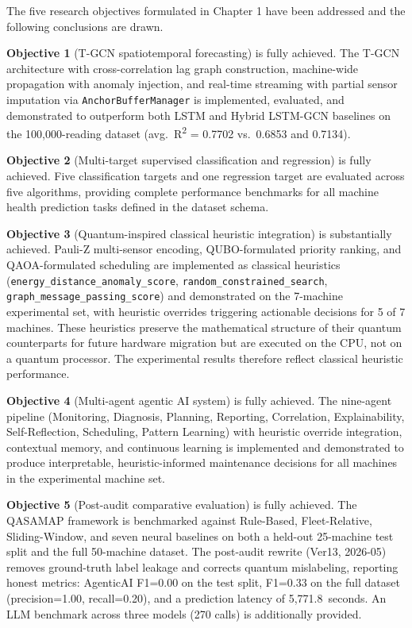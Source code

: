 The five research objectives formulated in Chapter 1 have been addressed and the following conclusions are drawn.

\textbf{Objective 1} (T-GCN spatiotemporal forecasting) is fully achieved. The T-GCN architecture with cross-correlation lag graph construction, machine-wide propagation with anomaly injection, and real-time streaming with partial sensor imputation via \texttt{AnchorBufferManager} is implemented, evaluated, and demonstrated to outperform both LSTM and Hybrid LSTM-GCN baselines on the 100,000-reading dataset (avg.\ R\textsuperscript{2} = 0.7702 vs.\ 0.6853 and 0.7134).

\textbf{Objective 2} (Multi-target supervised classification and regression) is fully achieved. Five classification targets and one regression target are evaluated across five algorithms, providing complete performance benchmarks for all machine health prediction tasks defined in the dataset schema.

\textbf{Objective 3} (Quantum-inspired classical heuristic integration) is substantially achieved. Pauli-Z multi-sensor encoding, QUBO-formulated priority ranking, and QAOA-formulated scheduling are implemented as classical heuristics (\texttt{energy\_distance\_anomaly\_score}, \texttt{random\_constrained\_search}, \texttt{graph\_message\_passing\_score}) and demonstrated on the 7-machine experimental set, with heuristic overrides triggering actionable decisions for 5 of 7 machines. These heuristics preserve the mathematical structure of their quantum counterparts for future hardware migration but are executed on the CPU, not on a quantum processor. The experimental results therefore reflect classical heuristic performance.

\textbf{Objective 4} (Multi-agent agentic AI system) is fully achieved. The nine-agent pipeline (Monitoring, Diagnosis, Planning, Reporting, Correlation, Explainability, Self-Reflection, Scheduling, Pattern Learning) with heuristic override integration, contextual memory, and continuous learning is implemented and demonstrated to produce interpretable, heuristic-informed maintenance decisions for all machines in the experimental machine set.

\textbf{Objective 5} (Post-audit comparative evaluation) is fully achieved. The QASAMAP framework is benchmarked against Rule-Based, Fleet-Relative, Sliding-Window, and seven neural baselines on both a held-out 25-machine test split and the full 50-machine dataset. The post-audit rewrite (Ver13, 2026-05) removes ground-truth label leakage and corrects quantum mislabeling, reporting honest metrics: AgenticAI F1=0.00 on the test split, F1=0.33 on the full dataset (precision=1.00, recall=0.20), and a prediction latency of 5,771.8~seconds. An LLM benchmark across three models (270 calls) is additionally provided.

